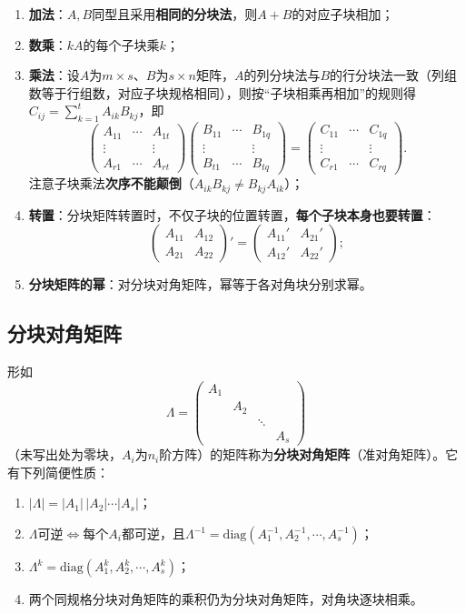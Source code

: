 \begin{enumerate}
\item \textbf{加法}：$A,B$同型且采用\textbf{相同的分块法}，则$A+B$的对应子块相加；
\item \textbf{数乘}：$kA$的每个子块乘$k$；
\item \textbf{乘法}：设$A$为$m\times s$、$B$为$s\times n$矩阵，$A$的列分块法与$B$的行分块法一致（列组数等于行组数，对应子块规格相同），则按“子块相乘再相加”的规则得$C_{ij}=\sum_{k=1}^{t}A_{ik}B_{kj}$，即
\[
\begin{pmatrix}A_{11}&\cdots&A_{1t}\\ \vdots&&\vdots\\ A_{r1}&\cdots&A_{rt}\end{pmatrix}
\begin{pmatrix}B_{11}&\cdots&B_{1q}\\ \vdots&&\vdots\\ B_{t1}&\cdots&B_{tq}\end{pmatrix}
=\begin{pmatrix}C_{11}&\cdots&C_{1q}\\ \vdots&&\vdots\\ C_{r1}&\cdots&C_{rq}\end{pmatrix}.
\]
注意子块乘法\textbf{次序不能颠倒}（$A_{ik}B_{kj}\neq B_{kj}A_{ik}$）；
\item \textbf{转置}：分块矩阵转置时，不仅子块的位置转置，\textbf{每个子块本身也要转置}：
\[
\begin{pmatrix}A_{11}&A_{12}\\A_{21}&A_{22}\end{pmatrix}'=\begin{pmatrix}A_{11}'&A_{21}'\\A_{12}'&A_{22}'\end{pmatrix};
\]
\item \textbf{分块矩阵的幂}：对分块对角矩阵，幂等于各对角块分别求幂。
\end{enumerate}

\subsection{分块对角矩阵}

形如
\[
\Lambda=\begin{pmatrix}
A_1&&&\\&A_2&&\\&&\ddots&\\&&&A_s\end{pmatrix}
\]
（未写出处为零块，$A_i$为$n_i$阶方阵）的矩阵称为\textbf{分块对角矩阵}（准对角矩阵）。它有下列简便性质：
\begin{enumerate}
\item $|\Lambda|=|A_1|\,|A_2|\cdots|A_s|$；
\item $\Lambda$可逆$\iff$每个$A_i$都可逆，且$\Lambda^{-1}=\mathrm{diag}(A_1^{-1},A_2^{-1},\cdots,A_s^{-1})$；
\item $\Lambda^{k}=\mathrm{diag}(A_1^{k},A_2^{k},\cdots,A_s^{k})$；
\item 两个同规格分块对角矩阵的乘积仍为分块对角矩阵，对角块逐块相乘。
\end{enumerate}

